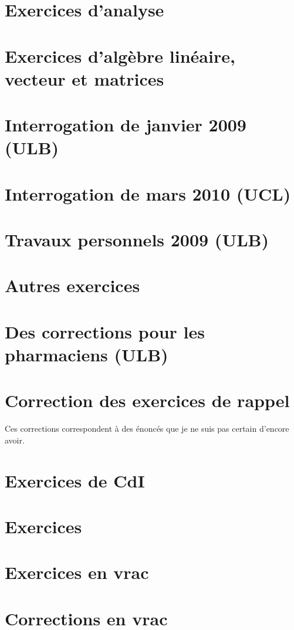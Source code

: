 \chapter{Exercices d'analyse}




\chapter{Exercices d'algèbre linéaire, vecteur et matrices}


\chapter{Interrogation de janvier 2009 (ULB)}


\chapter{Interrogation de mars 2010 (UCL)}


\chapter{Travaux personnels 2009 (ULB)}


\chapter{Autres exercices}


\chapter{Des corrections pour les pharmaciens (ULB)}


\chapter{Correction des exercices de rappel}    %
Ces corrections correspondent à des énoncés que je ne suis pas certain d'encore avoir.


\chapter{Exercices de CdI}

\chapter{Exercices}



\chapter{Exercices en vrac} %



 
\chapter{Corrections en vrac}   %



